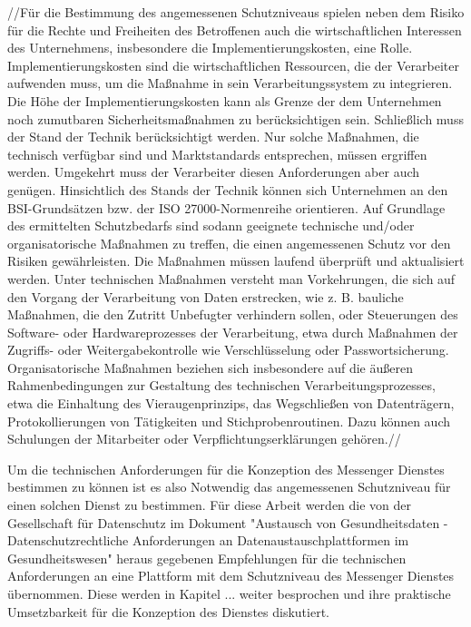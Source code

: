 //Für die Bestimmung des angemessenen Schutzniveaus spielen neben dem Risiko für die Rechte und Freiheiten des Betroffenen auch die wirtschaftlichen Interessen des Unternehmens, insbesondere die Implementierungskosten, eine Rolle. Implementierungskosten sind die wirtschaftlichen Ressourcen, die der Verarbeiter aufwenden muss, um die Maßnahme in sein Verarbeitungssystem zu integrieren. Die Höhe der Implementierungskosten kann als Grenze der dem Unternehmen noch zumutbaren Sicherheitsmaßnahmen zu berücksichtigen sein.
Schließlich muss der Stand der Technik berücksichtigt werden. Nur solche Maßnahmen, die technisch verfügbar sind und Marktstandards entsprechen, müssen ergriffen werden. Umgekehrt muss der Verarbeiter diesen Anforderungen aber auch genügen. Hinsichtlich des Stands der Technik können sich Unternehmen an den BSI-Grundsätzen bzw. der ISO 27000-Normenreihe orientieren.
Auf Grundlage des ermittelten Schutzbedarfs sind sodann geeignete technische und/oder organisatorische Maßnahmen zu treffen, die einen angemessenen Schutz vor den Risiken gewährleisten. Die Maßnahmen müssen laufend überprüft und aktualisiert werden.
Unter technischen Maßnahmen versteht man Vorkehrungen, die sich auf den Vorgang der Verarbeitung von Daten erstrecken, wie z. B. bauliche Maßnahmen, die den Zutritt Unbefugter verhindern sollen, oder Steuerungen des Software- oder Hardwareprozesses der Verarbeitung, etwa durch Maßnahmen der Zugriffs- oder Weitergabekontrolle wie Verschlüsselung oder Passwortsicherung.
Organisatorische Maßnahmen beziehen sich insbesondere auf die äußeren Rahmenbedingungen zur Gestaltung des technischen Verarbeitungsprozesses, etwa die Einhaltung des Vieraugenprinzips, das Wegschließen von Datenträgern, Protokollierungen von Tätigkeiten und Stichprobenroutinen. Dazu können auch Schulungen der Mitarbeiter oder Verpflichtungserklärungen gehören.//

Um die technischen Anforderungen für die Konzeption des Messenger Dienstes bestimmen zu können ist es also Notwendig das angemessenen Schutzniveau für einen solchen Dienst zu bestimmen. Für diese Arbeit werden die von der Gesellschaft für Datenschutz im Dokument "Austausch von Gesundheitsdaten -  Datenschutzrechtliche Anforderungen an Datenaustauschplattformen im Gesundheitswesen" heraus gegebenen Empfehlungen für die technischen Anforderungen an eine Plattform mit dem Schutzniveau des Messenger Dienstes übernommen. Diese werden in Kapitel ... weiter besprochen und ihre praktische Umsetzbarkeit für die Konzeption des Dienstes diskutiert. 


